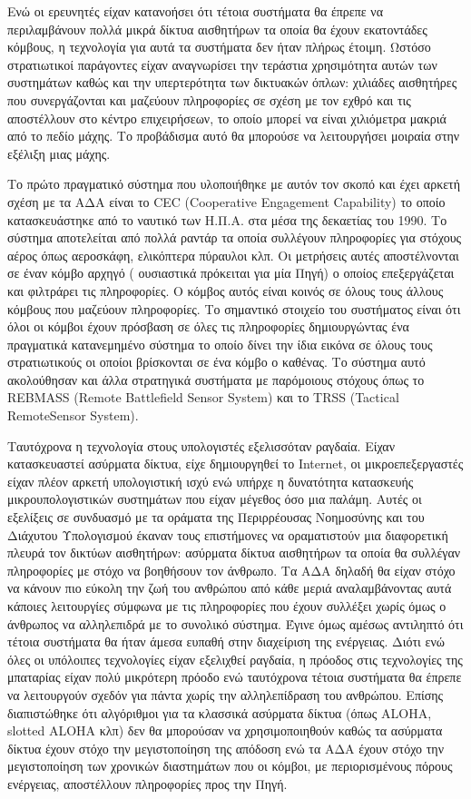 Ενώ οι ερευνητές είχαν κατανοήσει ότι τέτοια συστήματα θα έπρεπε να περιλαμβάνουν πολλά μικρά δίκτυα αισθητήρων τα οποία θα έχουν εκατοντάδες κόμβους, η τεχνολογία
για αυτά τα συστήματα δεν ήταν πλήρως έτοιμη.
Ωστόσο στρατιωτικοί παράγοντες είχαν αναγνωρίσει την τεράστια χρησιμότητα αυτών των συστημάτων καθώς και την υπερτερότητα των δικτυακών όπλων: χιλιάδες αισθητήρες που
συνεργάζονται και μαζεύουν πληροφορίες σε σχέση με τον εχθρό και τις αποστέλλουν στο κέντρο επιχειρήσεων, το οποίο μπορεί να είναι χιλιόμετρα μακριά από το πεδίο
μάχης.
Το προβάδισμα αυτό θα μπορούσε να λειτουργήσει μοιραία στην εξέλιξη μιας μάχης.

Το πρώτο πραγματικό σύστημα που υλοποιήθηκε με αυτόν τον σκοπό και έχει αρκετή σχέση με τα ΑΔΑ είναι το CEC (Cooperative Engagement Capability)\nocite{cec} το οποίο
κατασκευάστηκε από το ναυτικό των Η.Π.Α. στα μέσα της δεκαετίας του 1990.
Το σύστημα αποτελείται από πολλά ραντάρ τα οποία συλλέγουν πληροφορίες για στόχους αέρος όπως αεροσκάφη, ελικόπτερα πύραυλοι κλπ.
Οι μετρήσεις αυτές αποστέλνονται σε έναν κόμβο αρχηγό ( ουσιαστικά πρόκειται για μία Πηγή) ο οποίος επεξεργάζεται και φιλτράρει τις πληροφορίες.
Ο κόμβος αυτός είναι κοινός σε όλους τους άλλους κόμβους που μαζεύουν πληροφορίες.
Το σημαντικό στοιχείο του συστήματος είναι ότι όλοι οι κόμβοι έχουν πρόσβαση σε όλες τις πληροφορίες δημιουργώντας ένα πραγματικά κατανεμημένο σύστημα το οποίο δίνει
την ίδια εικόνα σε όλους τους στρατιωτικούς οι οποίοι βρίσκονται σε ένα κόμβο ο καθένας. Το σύστημα αυτό ακολούθησαν και άλλα στρατηγικά συστήματα με παρόμοιους
στόχους όπως το REΒMASS (Remote Battlefield Sensor System) και το TRSS (Tactical RemoteSensor System).


Ταυτόχρονα η τεχνολογία στους υπολογιστές εξελισσόταν ραγδαία.
Είχαν κατασκευαστεί ασύρματα δίκτυα, είχε δημιουργηθεί το Internet, οι μικροεπεξεργαστές είχαν πλέον αρκετή υπολογιστική ισχύ ενώ υπήρχε η δυνατότητα κατασκευής
μικρουπολογιστικών συστημάτων που είχαν μέγεθος όσο μια παλάμη.
Αυτές οι εξελίξεις σε συνδυασμό με τα οράματα της Περιρρέουσας Νοημοσύνης και του Διάχυτου Υπολογισμού έκαναν τους επιστήμονες να οραματιστούν μια διαφορετική πλευρά
τον δικτύων αισθητήρων: ασύρματα δίκτυα αισθητήρων τα οποία θα συλλέγαν πληροφορίες με στόχο να βοηθήσουν τον άνθρωπο.
Τα ΑΔΑ δηλαδή θα είχαν στόχο να κάνουν πιο εύκολη την ζωή του ανθρώπου από κάθε μεριά αναλαμβάνοντας αυτά κάποιες λειτουργίες σύμφωνα με τις πληροφορίες που έχουν
συλλέξει χωρίς όμως ο άνθρωπος να αλληλεπιδρά με το συνολικό σύστημα.
Έγινε όμως αμέσως αντιληπτό ότι τέτοια συστήματα θα ήταν άμεσα ευπαθή στην διαχείριση της ενέργειας.
Διότι ενώ όλες οι υπόλοιπες τεχνολογίες είχαν εξελιχθεί ραγδαία, η πρόοδος στις τεχνολογίες της μπαταρίας είχαν πολύ μικρότερη πρόοδο ενώ ταυτόχρονα τέτοια συστήματα
θα έπρεπε να λειτουργούν σχεδόν για πάντα χωρίς την αλληλεπίδραση του ανθρώπου.
Επίσης διαπιστώθηκε ότι αλγόριθμοι για τα κλασσικά ασύρματα δίκτυα (όπως ALOHA, slotted ALOHA κλπ) δεν θα μπορούσαν να χρησιμοποιηθούν καθώς τα ασύρματα δίκτυα έχουν
στόχο την μεγιστοποίηση της απόδοση ενώ τα ΑΔΑ έχουν στόχο την μεγιστοποίηση των χρονικών διαστημάτων που οι κόμβοι, με περιορισμένους πόρους ενέργειας, αποστέλλουν
πληροφορίες προς την Πηγή.

